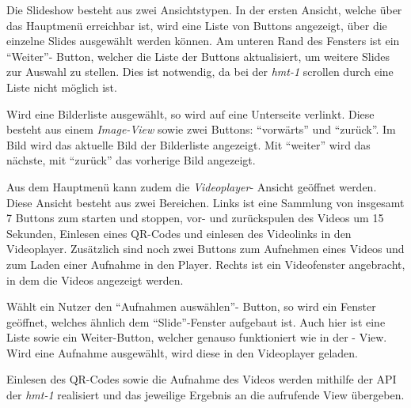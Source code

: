 Die Slideshow besteht aus zwei Ansichtstypen. In der ersten Ansicht, welche über das Hauptmenü erreichbar ist, wird eine Liste von Buttons angezeigt, über die einzelne Slides ausgewählt werden können. Am unteren Rand des Fensters ist ein \enquote{Weiter}- Button, welcher die Liste der Buttons aktualisiert, um weitere Slides zur Auswahl zu stellen. Dies ist notwendig, da bei der \emph{hmt-1} scrollen durch eine Liste nicht möglich ist.

Wird eine Bilderliste ausgewählt, so wird auf eine Unterseite verlinkt. Diese besteht aus einem \emph{Image-View} sowie zwei Buttons: \enquote{vorwärts} und \enquote{zurück}. Im Bild wird das aktuelle Bild der Bilderliste angezeigt. Mit \enquote{weiter} wird das nächste, mit \enquote{zurück} das vorherige Bild angezeigt.

Aus dem Hauptmenü kann zudem die \emph{Videoplayer}- Ansicht geöffnet werden. Diese Ansicht besteht aus zwei Bereichen. Links ist eine Sammlung von insgesamt 7 Buttons zum starten und stoppen, vor- und zurückspulen des Videos um 15 Sekunden, Einlesen eines QR-Codes und einlesen des Videolinks in den Videoplayer. Zusätzlich sind noch zwei Buttons zum Aufnehmen eines Videos und zum Laden einer Aufnahme in den Player. Rechts ist ein Videofenster angebracht, in dem die Videos angezeigt werden.

Wählt ein Nutzer den \enquote{Aufnahmen auswählen}- Button, so wird ein Fenster geöffnet, welches ähnlich dem \enquote{Slide}-Fenster aufgebaut ist. Auch hier ist eine Liste sowie ein Weiter-Button, welcher genauso funktioniert wie in der - View. Wird eine Aufnahme ausgewählt, wird diese in den Videoplayer geladen.

Einlesen des QR-Codes sowie die Aufnahme des Videos werden mithilfe der API der \emph{hmt-1} realisiert und das jeweilige Ergebnis an die aufrufende View übergeben.


